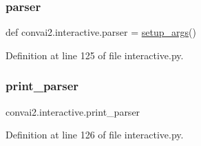 \subsubsection{\texorpdfstring{parser}{parser}}
{\footnotesize\ttfamily def convai2.\+interactive.\+parser = \hyperlink{namespaceconvai2_1_1interactive_a67e317db1e41e25d73827a1dd68ff78a}{setup\+\_\+args}()}



Definition at line 125 of file interactive.\+py.

\mbox{\label{namespaceconvai2_1_1interactive_a46025f3575b0196a73e0f3fa699f3cf2}} 
\subsubsection{\texorpdfstring{print\+\_\+parser}{print\_parser}}
{\footnotesize\ttfamily convai2.\+interactive.\+print\+\_\+parser}



Definition at line 126 of file interactive.\+py.

